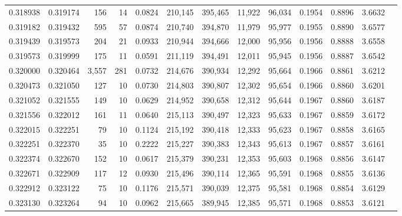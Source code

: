 \begin{tabular}{rrrrrrrrrrrrr}
0.318938 & 0.319174 &   156 &  14 &                                     0.0824 & 210,145 & 395,465 &  11,922 &  96,034 & 0.1954 & 0.8896 & 3.6632 \\
0.319182 & 0.319432 &   595 &  57 &                                     0.0874 & 210,740 & 394,870 &  11,979 &  95,977 & 0.1955 & 0.8890 & 3.6577 \\
0.319439 & 0.319573 &   204 &  21 &                                     0.0933 & 210,944 & 394,666 &  12,000 &  95,956 & 0.1956 & 0.8888 & 3.6558 \\
0.319573 & 0.319999 &   175 &  11 &                                     0.0591 & 211,119 & 394,491 &  12,011 &  95,945 & 0.1956 & 0.8887 & 3.6542 \\
0.320000 & 0.320464 & 3,557 & 281 &                                     0.0732 & 214,676 & 390,934 &  12,292 &  95,664 & 0.1966 & 0.8861 & 3.6212 \\
0.320473 & 0.321050 &   127 &  10 &                                     0.0730 & 214,803 & 390,807 &  12,302 &  95,654 & 0.1966 & 0.8860 & 3.6201 \\
0.321052 & 0.321555 &   149 &  10 &                                     0.0629 & 214,952 & 390,658 &  12,312 &  95,644 & 0.1967 & 0.8860 & 3.6187 \\
0.321556 & 0.322012 &   161 &  11 &                                     0.0640 & 215,113 & 390,497 &  12,323 &  95,633 & 0.1967 & 0.8859 & 3.6172 \\
0.322015 & 0.322251 &    79 &  10 &                                     0.1124 & 215,192 & 390,418 &  12,333 &  95,623 & 0.1967 & 0.8858 & 3.6165 \\
0.322251 & 0.322370 &    35 &  10 &                                     0.2222 & 215,227 & 390,383 &  12,343 &  95,613 & 0.1967 & 0.8857 & 3.6161 \\
0.322374 & 0.322670 &   152 &  10 &                                     0.0617 & 215,379 & 390,231 &  12,353 &  95,603 & 0.1968 & 0.8856 & 3.6147 \\
0.322671 & 0.322909 &   117 &  12 &                                     0.0930 & 215,496 & 390,114 &  12,365 &  95,591 & 0.1968 & 0.8855 & 3.6136 \\
0.322912 & 0.323122 &    75 &  10 &                                     0.1176 & 215,571 & 390,039 &  12,375 &  95,581 & 0.1968 & 0.8854 & 3.6129 \\
0.323130 & 0.323264 &    94 &  10 &                                     0.0962 & 215,665 & 389,945 &  12,385 &  95,571 & 0.1968 & 0.8853 & 3.6121 \\

\end{tabular}
